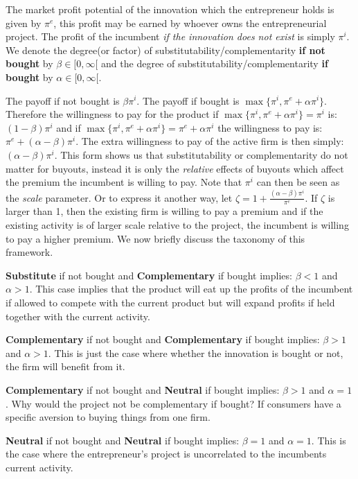The market profit potential of the innovation which the entrepreneur holds is given by $\pi^e$, this profit may be earned by whoever owns the entrepreneurial project. The profit of the incumbent \textit{if the innovation does not exist} is simply $\pi^i$. We denote the degree(or factor) of substitutability/complementarity \textbf{if not bought} by $\beta \in [ 0, \infty [$ and the degree of substitutability/complementarity  \textbf{if bought} by $\alpha \in [0, \infty [ $. 

The payoff if not bought is $ \beta \pi^i$. The payoff if bought is $\max\{ \pi^i, \pi^e + \alpha \pi^i   \}$. Therefore the willingness to pay for the product if  $\max\{ \pi^i, \pi^e + \alpha \pi^i   \} = \pi^i $ is: $(1-\beta) \pi^i$ and if $\max\{ \pi^i, \pi^e + \alpha \pi^i   \} = \pi^e + \alpha \pi^i $ the willingness to pay is: $\pi^e+ (\alpha-\beta) \pi^i$. The extra willingness to pay of the active firm is then simply: $(\alpha-\beta)\pi^i$. This form shows us that substitutability or complementarity do not matter for buyouts, instead it is only the \textit{relative} effects of buyouts which affect the premium the incumbent is willing to pay. Note that $\pi^i$ can then be seen as the \textit{scale} parameter. Or to express it another way, let $\zeta=1 + \frac{(\alpha-\beta)\pi^i}{\pi^e}$. If $\zeta$ is larger than 1, then the existing firm is willing to pay a premium and if the existing activity is of larger scale relative to the project, the incumbent is willing to pay a higher premium. We now briefly discuss the taxonomy of this framework. 

\textbf{Substitute}  if not bought and \textbf{Complementary} if bought implies: $\beta<1$ and $\alpha>1$. This case implies that the product will eat up the profits of the incumbent if allowed to compete with the current product but will expand profits if held together with the current activity. 

\textbf{Complementary} if not bought and \textbf{Complementary} if bought implies: $\beta>1$ and $\alpha>1$. This is just the case where whether the innovation is bought or not, the firm will benefit from it.

\textbf{Complementary} if not bought and \textbf{Neutral} if bought implies: $\beta>1$ and $\alpha=1$. Why would the project not be complementary if bought? If consumers have a specific aversion to buying things from one firm. 

\textbf{Neutral} if not bought and \textbf{Neutral} if bought implies: $\beta=1$ and $\alpha=1$. This is the case where the entrepreneur's project is uncorrelated to the incumbents current activity.  

